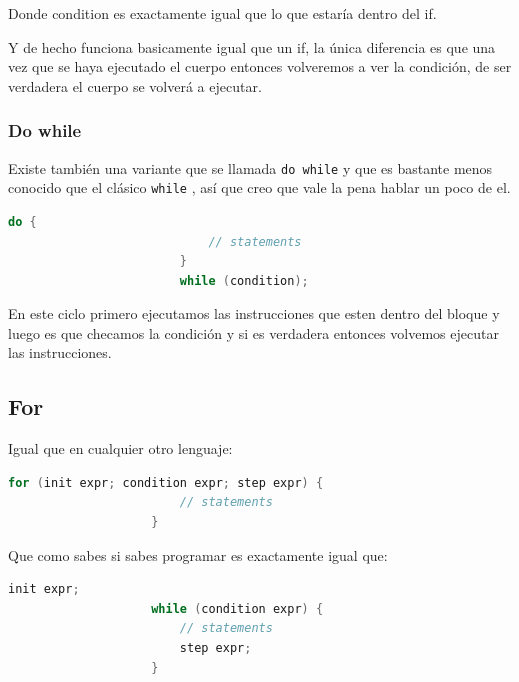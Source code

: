 \documentclass[12pt, fleqn]{report}                             %
\theoremstyle{break}                                            %
\newcommand{\textCode}[1]  { \texttt{#1} }                      %
\begin{document}
                Donde condition es exactamente igual que lo que estaría dentro
                del if.

                Y de hecho funciona basicamente igual que un if, la única diferencia
                es que una vez que se haya ejecutado el cuerpo entonces volveremos a ver la 
                condición, de ser verdadera el cuerpo se volverá a ejecutar.

                \subsubsection{Do while}

                    Existe también una variante que se llamada \textCode{do while} y que 
                    es bastante menos conocido que el clásico \textCode{while}, así que creo
                    que vale la pena hablar un poco de el.
                    \begin{lstlisting}[language=C++, gobble=24]
                        do {
                            // statements
                        }
                        while (condition);
                    \end{lstlisting}

                    En este ciclo primero ejecutamos las instrucciones que esten dentro del bloque
                    y luego es que checamos la condición y si es verdadera entonces volvemos 
                    ejecutar las instrucciones.

            \clearpage
            \subsection{For}

                Igual que en cualquier otro lenguaje:
                \begin{lstlisting}[language=C++, gobble=20]
                    for (init expr; condition expr; step expr) {
                        // statements
                    }
                \end{lstlisting}

                Que como sabes si sabes programar es exactamente igual que:
                \begin{lstlisting}[language=C++, gobble=20]
                    init expr;
                    while (condition expr) {
                        // statements
                        step expr;
                    }
                \end{lstlisting}
\end{document}
